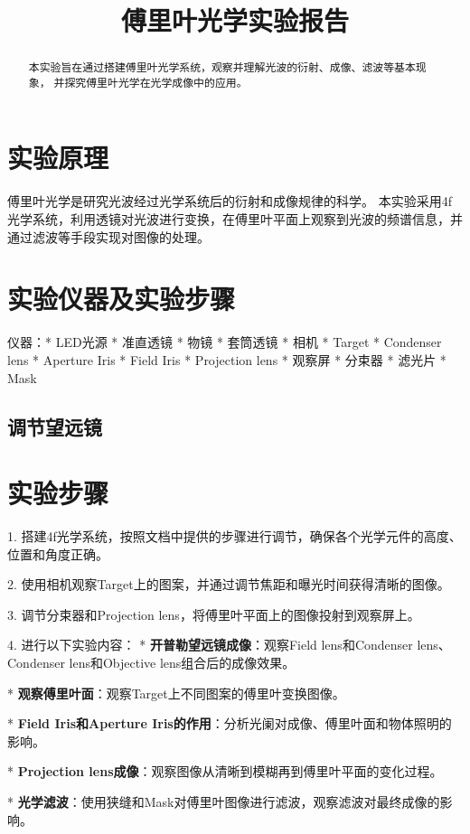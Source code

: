 \documentclass{ctexart}
\title{傅里叶光学实验报告}
\begin{document}
\maketitle

\begin{abstract}
  本实验旨在通过搭建傅里叶光学系统，观察并理解光波的衍射、成像、滤波等基本现象，
  并探究傅里叶光学在光学成像中的应用。
\end{abstract}

\section{实验原理}
傅里叶光学是研究光波经过光学系统后的衍射和成像规律的科学。
本实验采用4f光学系统，利用透镜对光波进行变换，在傅里叶平面上观察到光波的频谱信息，并通过滤波等手段实现对图像的处理。

\section{实验仪器及实验步骤}
  仪器：* LED光源
  * 准直透镜
  * 物镜
  * 套筒透镜
  * 相机
  * Target
  * Condenser lens
  * Aperture Iris
  * Field Iris
  * Projection lens
  * 观察屏
  * 分束器
  * 滤光片
  * Mask
  \subsection{调节望远镜}

\section{实验步骤}
1. 搭建4f光学系统，按照文档中提供的步骤进行调节，确保各个光学元件的高度、位置和角度正确。

2. 使用相机观察Target上的图案，并通过调节焦距和曝光时间获得清晰的图像。

3. 调节分束器和Projection lens，将傅里叶平面上的图像投射到观察屏上。

4. 进行以下实验内容：
    * \textbf{开普勒望远镜成像}：观察Field lens和Condenser lens、Condenser lens和Objective lens组合后的成像效果。
    
    * \textbf{观察傅里叶面}：观察Target上不同图案的傅里叶变换图像。
    
    * \textbf{Field Iris和Aperture Iris的作用}：分析光阑对成像、傅里叶面和物体照明的影响。
    
    * \textbf{Projection lens成像}：观察图像从清晰到模糊再到傅里叶平面的变化过程。
    
    * \textbf{光学滤波}：使用狭缝和Mask对傅里叶图像进行滤波，观察滤波对最终成像的影响。
    
\end{document}
